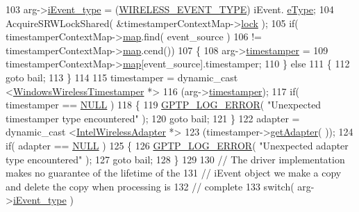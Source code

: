 \begin{DoxyCode}
103     arg->\hyperlink{struct_wireless_timestamper_callback_arg_a73268234eb2338c6296c2b78e4685a66}{iEvent\_type} = (\hyperlink{wireless__tstamper_8hpp_af5e1de4a157974fc2825521b20b357b1}{WIRELESS\_EVENT\_TYPE}) iEvent.
      \hyperlink{struct_i_n_t_e_l___e_v_e_n_t_adfd2791bfb7c2d0237bbe21117619d0b}{eType};
104     AcquireSRWLockShared( &timestamperContextMap->\hyperlink{class_locked_timestamper_context_map_afed18a2dbad108768defb51810a7a760}{lock} );
105     \textcolor{keywordflow}{if}( timestamperContextMap->\hyperlink{class_locked_timestamper_context_map_a8880e18111e491249278c4cebf453b97}{map}.find( event\_source )
106         != timestamperContextMap->\hyperlink{class_locked_timestamper_context_map_a8880e18111e491249278c4cebf453b97}{map}.cend())
107     \{
108         arg->\hyperlink{struct_wireless_timestamper_callback_arg_a63b4bb264af088830cdb1fea4e6ad126}{timestamper} =
109             timestamperContextMap->\hyperlink{class_locked_timestamper_context_map_a8880e18111e491249278c4cebf453b97}{map}[event\_source].timestamper;
110     \} \textcolor{keywordflow}{else}
111     \{
112         \textcolor{keywordflow}{goto} bail;
113     \}
114 
115     timestamper = dynamic\_cast <\hyperlink{class_windows_wireless_timestamper}{WindowsWirelessTimestamper} *>
116         (arg->\hyperlink{struct_wireless_timestamper_callback_arg_a63b4bb264af088830cdb1fea4e6ad126}{timestamper});
117     \textcolor{keywordflow}{if}( timestamper == \hyperlink{openavb__types__base__pub_8h_a070d2ce7b6bb7e5c05602aa8c308d0c4}{NULL} )
118     \{
119         \hyperlink{gptp__log_8hpp_afefbb1009717c128012bfeed94842987}{GPTP\_LOG\_ERROR}( \textcolor{stringliteral}{"Unexpected timestamper type encountered"} );
120         \textcolor{keywordflow}{goto} bail;
121     \}
122     adapter = dynamic\_cast <\hyperlink{class_intel_wireless_adapter}{IntelWirelessAdapter} *>
123         (timestamper->\hyperlink{class_windows_wireless_timestamper_ac918d1eb6ce6ae0cd6705bd56391182a}{getAdapter}( ));
124     \textcolor{keywordflow}{if}( adapter == \hyperlink{openavb__types__base__pub_8h_a070d2ce7b6bb7e5c05602aa8c308d0c4}{NULL} )
125     \{
126         \hyperlink{gptp__log_8hpp_afefbb1009717c128012bfeed94842987}{GPTP\_LOG\_ERROR}( \textcolor{stringliteral}{"Unexpected adapter type encountered"} );
127         \textcolor{keywordflow}{goto} bail;
128     \}
129 
130     \textcolor{comment}{// The driver implementation makes no guarantee of the lifetime of the}
131     \textcolor{comment}{// iEvent object we make a copy and delete the copy when processing is}
132     \textcolor{comment}{// complete}
133     \textcolor{keywordflow}{switch}( arg->\hyperlink{struct_wireless_timestamper_callback_arg_a73268234eb2338c6296c2b78e4685a66}{iEvent\_type} )

\end{DoxyCode}
